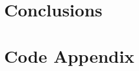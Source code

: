 \documentclass[11pt]{report}
\begin{document}
\section*{Conclusions}


\section*{Code Appendix}












\newpage
\printbibliography
\end{document}

